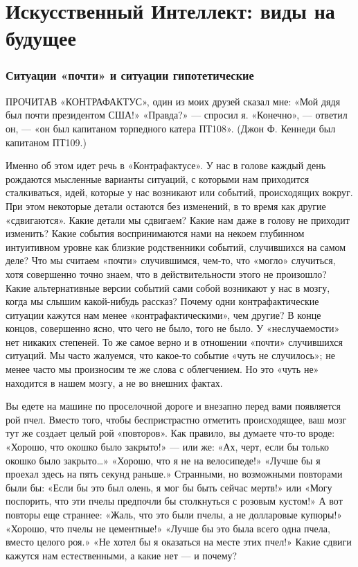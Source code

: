 \documentclass[../main.tex]{subfiles}
\begin{document}
\chapter{Искусственный Интеллект: виды на будущее}

\subsection{Ситуации «почти» и ситуации гипотетические}

ПРОЧИТАВ «КОНТРАФАКТУС», один из моих друзей сказал мне: «Мой дядя был почти президентом США!» «Правда?» --- спросил я. «Конечно», --- ответил он, --- «он был капитаном торпедного катера ПТ108». (Джон Ф. Кеннеди был капитаном ПТ109.)

Именно об этом идет речь в «Контрафактусе». У нас в голове каждый день рождаются мысленные варианты ситуаций, с которыми нам приходится сталкиваться, идей, которые у нас возникают или событий, происходящих вокруг. При этом некоторые детали остаются без изменений, в то время как другие «сдвигаются». Какие детали мы сдвигаем? Какие нам даже в голову не приходит изменить? Какие события воспринимаются нами на некоем глубинном интуитивном уровне как близкие родственники событий, случившихся на самом деле? Что мы считаем «почти» случившимся, чем-то, что «могло» случиться, хотя совершенно точно знаем, что в действительности этого не произошло? Какие альтернативные версии событий сами собой возникают у нас в мозгу, когда мы слышим какой-нибудь рассказ? Почему одни контрафактические ситуации кажутся нам менее «контрафактическими», чем другие? В конце концов, совершенно ясно, что чего не было, того не было. У «неслучаемости» нет никаких степеней. То же самое верно и в отношении «почти» случившихся ситуаций. Мы часто жалуемся, что какое-то событие «чуть не случилось»; не менее часто мы произносим те же слова с облегчением. Но это «чуть не» находится в нашем мозгу, а не во внешних фактах.

Вы едете на машине по проселочной дороге и внезапно перед вами появляется рой пчел. Вместо того, чтобы беспристрастно отметить происходящее, ваш мозг тут же создает целый рой «повторов». Как правило, вы думаете что-то вроде: «Хорошо, что окошко было закрыто!» --- или же: «Ах, черт, если бы только окошко было закрыто\ldots» «Хорошо, что я не на велосипеде!» «Лучше бы я проехал здесь на пять секунд раньше.» Странными, но возможными повторами были бы: «Если бы это был олень, я мог бы быть сейчас мертв!» или «Могу поспорить, что эти пчелы предпочли бы столкнуться с розовым кустом!» А вот повторы еще страннее: «Жаль, что это были пчелы, а не долларовые купюры!» «Хорошо, что пчелы не цементные!» «Лучше бы это была всего одна пчела, вместо целого роя.» «Не хотел бы я оказаться на месте этих пчел!» Какие сдвиги кажутся нам естественными, а какие нет --- и почему?
\end{document}
